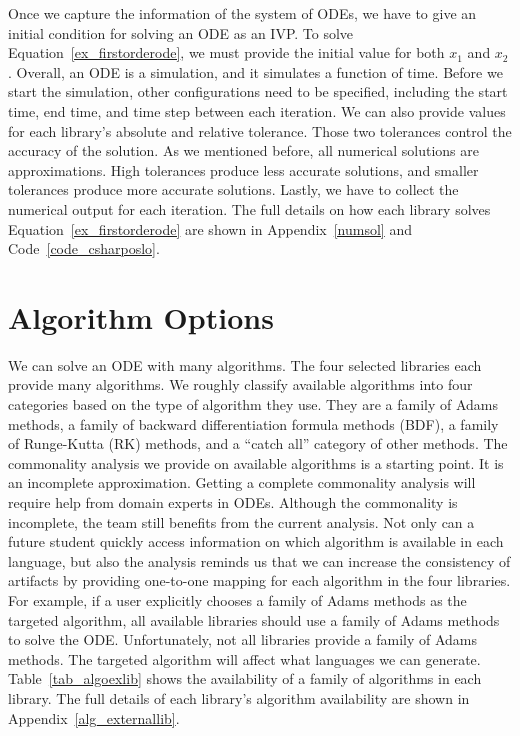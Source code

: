 Once we capture the information of the system of ODEs, we have to give an initial condition for solving an ODE as an IVP. To solve Equation~\ref{ex_firstorderode}, we must provide the initial value for both $x_1$ and $x_2$. Overall, an ODE is a simulation, and it simulates a function of time. Before we start the simulation, other configurations need to be specified, including the start time, end time, and time step between each iteration. We can also provide values for each library's absolute and relative tolerance. Those two tolerances control the accuracy of the solution. As we mentioned before, all numerical solutions are approximations. High tolerances produce less accurate solutions, and smaller tolerances produce more accurate solutions. Lastly, we have to collect the numerical output for each iteration. The full details on how each library solves Equation~\ref{ex_firstorderode} are shown in Appendix~\ref{numsol} and Code~\ref{code_csharposlo}.

\section{Algorithm Options}
\label{se_algorithmoptiopns}
We can solve an ODE with many algorithms. The four selected libraries each provide many algorithms. We roughly classify available algorithms into four categories based on the type of algorithm they use. They are a family of Adams methods, a family of backward differentiation formula methods (BDF), a family of Runge-Kutta (RK) methods, and a ``catch all'' category of other methods. The commonality analysis we provide on available algorithms is a starting point. It is an incomplete approximation. Getting a complete commonality analysis will require help from domain experts in ODEs. Although the commonality is incomplete, the team still benefits from the current analysis. Not only can a future student quickly access information on which algorithm is available in each language, but also the analysis reminds us that we can increase the consistency of artifacts by providing one-to-one mapping for each algorithm in the four libraries. For example, if a user explicitly chooses a family of Adams methods as the targeted algorithm, all available libraries should use a family of Adams methods to solve the ODE. Unfortunately, not all libraries provide a family of Adams methods. The targeted algorithm will affect what languages we can generate. Table~\ref{tab_algoexlib} shows the availability of a family of algorithms in each library. The full details of each library's algorithm availability are shown in Appendix~\ref{alg_externallib}.

